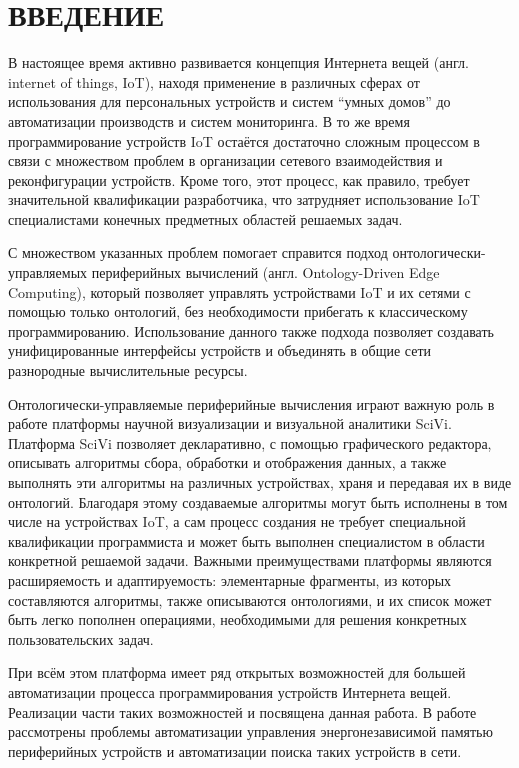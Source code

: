 \chapter*{ВВЕДЕНИЕ}

В настоящее время активно развивается концепция Интернета вещей (англ. internet of things, IoT), находя применение в различных сферах от использования для персональных устройств и систем "`умных домов"' до автоматизации производств и систем мониторинга.
В то же время программирование устройств IoT остаётся достаточно сложным процессом в связи с множеством проблем в организации сетевого взаимодействия и реконфигурации устройств.
Кроме того, этот процесс, как правило, требует значительной квалификации разработчика, что затрудняет использование IoT специалистами конечных предметных областей решаемых задач.

С множеством указанных проблем помогает справится подход онтологически-управляемых периферийных вычислений (англ. Ontology-Driven Edge Computing), который позволяет управлять устройствами IoT и их сетями с помощью только онтологий, без необходимости прибегать к классическому программированию\cite{incollection:odec}.
Использование данного также подхода позволяет создавать унифицированные интерфейсы устройств и объединять в общие сети разнородные вычислительные ресурсы\cite{booktel:eon-communications}.

Онтологически-управляемые периферийные вычисления играют важную роль в работе платформы научной визуализации и визуальной аналитики SciVi\cite{article:scivi, article:scivi-overview}.
Платформа SciVi позволяет декларативно, с помощью графического редактора, описывать алгоритмы сбора, обработки и отображения данных, а также выполнять эти алгоритмы на различных устройствах, храня и передавая их в виде онтологий.
Благодаря этому создаваемые алгоритмы могут быть исполнены в том числе на устройствах IoT, а сам процесс создания не требует специальной квалификации программиста и может быть выполнен специалистом в области конкретной решаемой задачи.
Важными преимуществами платформы являются расширяемость и адаптируемость: элементарные фрагменты, из которых составляются алгоритмы, также описываются онтологиями, и их список может быть легко пополнен операциями, необходимыми для решения конкретных пользовательских задач.

При всём этом платформа имеет ряд открытых возможностей для большей автоматизации процесса программирования устройств Интернета вещей.
Реализации части таких возможностей и посвящена данная работа.
В работе рассмотрены проблемы автоматизации управления энергонезависимой памятью периферийных устройств и автоматизации поиска таких устройств в сети.

